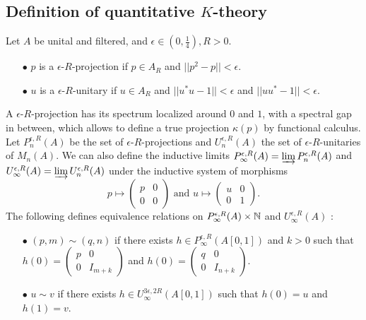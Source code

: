 \subsection{Definition of quantitative $K$-theory} 

Let $A$ be unital and filtered, and $\epsilon\in (0,\frac{1}{4}),R>0$.
\begin{itemize}
\item[$\bullet$] $p$ is a $\epsilon$-$R$-projection if $p\in A_R$ and $||p^2-p||<\epsilon$.
\item[$\bullet$] $u$ is a $\epsilon$-$R$-unitary if $u\in A_R$ and $||u^*u-1||<\epsilon$ and $||uu^*-1||<\epsilon$.\\
\end{itemize}

A $\epsilon$-$R$-projection has its spectrum localized around $0$ and $1$, with a spectral gap in between, which allows to define a true projection $\kappa(p)$ by functional calculus.\\ 

Let $P^{\epsilon, R}_n(A)$ be the set of $\epsilon$-$R$-projections and $U^{\epsilon,R}_n(A)$ the set of $\epsilon$-$R$-unitaries of $M_n(A)$. We can also define the inductive limits $P^{\epsilon, R}_\infty(A)=\varinjlim P^{\epsilon,R}_n(A)$ and $U^{\epsilon, R}_\infty(A)=\varinjlim U^{\epsilon,R}_n(A)$ under the inductive system of morphisms 
\[p\mapsto \begin{pmatrix} p & 0 \\0 & 0\end{pmatrix}\text{ and }u\mapsto \begin{pmatrix} u & 0 \\0 & 1\end{pmatrix}.\]
 The following defines equivalence relations on $P^{\epsilon,R}_\infty(A)\times \mathbb N$ and $U_\infty^{\epsilon,R}(A)$ :
\begin{itemize}
\item[$\bullet$] $(p,m)\sim (q,n)$ if there exists $h\in P^{\epsilon,R}_\infty(A[0,1])$ and $k>0$ such that $h(0)=\begin{pmatrix} p & 0 \\0 & I_{m+k}\end{pmatrix}$ and $h(0)=\begin{pmatrix} q & 0 \\0 & I_{n+k}\end{pmatrix}$.
\item[$\bullet$] $u\sim v$ if there exists $h\in U^{3\epsilon,2R}_\infty(A[0,1])$ such that $h(0)=u$ and $h(1)=v$.
\end{itemize}

